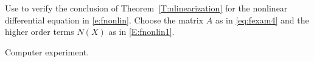 \documentclass{ximera}
\begin{document}
\begin{exercise} \label{c11.4.7}
Use \Matlab to verify the conclusion of Theorem~\ref{T:nlinearization}
for the nonlinear differential equation in \eqref{e:fnonlin}.  Choose
the matrix $A$ as in \eqref{eq:fexam4} and the higher order terms $N(X)$
as in \eqref{E:fnonlin1}.

\begin{solution}
Computer experiment.




\end{solution}
\end{exercise}
\end{document}

